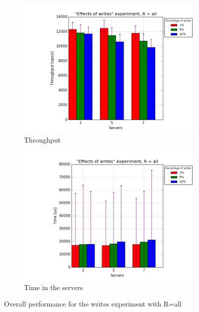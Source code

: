 \documentclass[11pt]{article}
\begin{document}
\begin{figure}
\centering
\begin{subfigure}{.5\textwidth}
	\centering
	\includegraphics[width=\linewidth]{plots/writes-2-replication}
	\caption{Throughput}
	\label{fig:writes-throughput-2}
\end{subfigure}%
\begin{subfigure}{.5\textwidth}
	\centering
	\includegraphics[width=\linewidth]{plots/writes-response_time-2-replication}
	\caption{Time in the servers}
	\label{fig:writes-reponse-time-2}
\end{subfigure}
\caption{Overall performance for the writes experiment with R=all}
\label{fig:writes-overall}
\end{figure}
\end{document}
